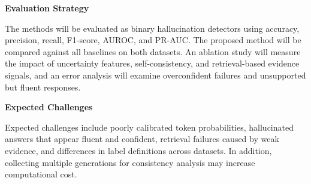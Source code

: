 \documentclass[10pt]{article}
\newcommand{\proposalsection}[1]{\vspace{2pt}\textbf{\normalsize #1}\par}
\begin{document}
\proposalsection{Evaluation Strategy}
The methods will be evaluated as binary hallucination detectors using accuracy, precision, recall, F1-score, AUROC, and PR-AUC. The proposed method will be compared against all baselines on both datasets. An ablation study will measure the impact of uncertainty features, self-consistency, and retrieval-based evidence signals, and an error analysis will examine overconfident failures and unsupported but fluent responses.

\proposalsection{Expected Challenges}
Expected challenges include poorly calibrated token probabilities, hallucinated answers that appear fluent and confident, retrieval failures caused by weak evidence, and differences in label definitions across datasets. In addition, collecting multiple generations for consistency analysis may increase computational cost.
\end{document}
